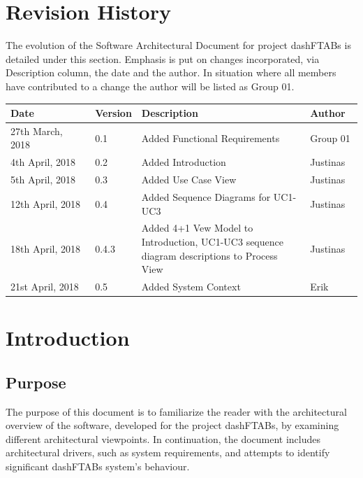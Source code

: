 \documentclass[12pt]{article}
\begin{document}
\section{Revision History}
The evolution of the Software Architectural Document for project dashFTABs is detailed under this section. Emphasis is put on changes incorporated, via Description column, the date and the author. In situation where all members have contributed to a change the author will be listed as Group 01.
\begin{longtable}{ | p{0.25\linewidth} | p{0.1\linewidth} | p{0.5\linewidth} | p{0.15\linewidth} | }\hline 
    Date & Version & Description & Author \\ \hline
   	27th March, 2018 & 0.1 & Added Functional Requirements & Group 01\\ \hline
   	4th April, 2018 & 0.2 & Added Introduction & Justinas\\ \hline
   	5th April, 2018 & 0.3 & Added Use Case View & Justinas\\ \hline
   	12th April, 2018 & 0.4 & Added Sequence Diagrams for UC1-UC3 & Justinas\\ \hline
	18th April, 2018 & 0.4.3 & Added 4+1 Vew Model to Introduction, UC1-UC3 sequence diagram descriptions to Process View & Justinas\\ \hline
	21st April, 2018 & 0.5 & Added System Context & Erik\\ \hline

\end{longtable}
\pagebreak

\section{Introduction}
\subsection{Purpose}
The purpose of this document is to familiarize the reader with the architectural overview of the software, developed for the project dashFTABs, by examining different architectural viewpoints. In continuation, the document includes architectural drivers, such as system requirements, and attempts to identify significant dashFTABs system’s behaviour.\par
\end{document}
